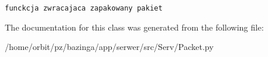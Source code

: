 \footnotesize\begin{verbatim}
funckcja zwracajaca zapakowany pakiet

\end{verbatim}
\normalsize
 

The documentation for this class was generated from the following file:\begin{CompactItemize}
\item 
/home/orbit/pz/bazinga/app/serwer/src/Serv/Packet.py\end{CompactItemize}
